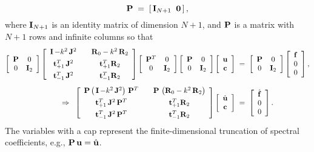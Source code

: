 \documentclass[%
secnumarabic,%
 amssymb, amsmath,%
 aps,prf,superscriptaddress,longbibliography
frontmatterverbose,
]{revtex4-2}
\begin{document}
\begin{equation}\label{eq:project}
  \mathbf{P} \;=\; \left[\,\mathbf I_{N+1}\;\; \mathbf 0 \,\right],
\end{equation}
where $\mathbf I_{N+1}$ is an identity matrix of dimension $N+1$, and $\mathbf{P}$ is a matrix with $N + 1$ rows and infinite columns so that 
\begin{align}
  \left[\begin{array}{ccc}
    \mathbf{P} & 0\\
    0 & \mathbf I_2
  \end{array}\right]\left[\begin{array}{ccc}
    \mathbf I\,\mathbf{-} k^2 \,\mathbf J^2 & & \mathbf{R}_0 - k^2\, \mathbf{R}_2\\[0.15cm]
    \mathbf{t}_{+1}^T \,\mathbf J^2 & & \mathbf{t}_{+1}^T \mathbf{R}_2\\[0.15cm]
    \mathbf{t}_{-1}^T \,\mathbf J^2 & & \mathbf{t}_{-1}^T \mathbf{R}_2
  \end{array}\right]\left[\begin{array}{ccc}
    \mathbf{P}^T & 0\\
    0 & \mathbf I_2
  \end{array}\right]\left[\begin{array}{ccc}
    \mathbf{P} & 0\\
    0 & \mathbf I_2
  \end{array}\right]\left[\begin{array}{c}
    \mathbf{u}\\
    \mathbf{c}
  \end{array}\right] \;&=\; \left[\begin{array}{ccc}
    \mathbf{P} & 0\\
    0 & \mathbf I_2
  \end{array}\right]\left[\begin{array}{c}
  \mathbf{f}\\
  0\\
  0
  \end{array}\right],\notag\\[0.15cm]
  \Rightarrow\;\; \left[\begin{array}{ccc}
    \mathbf{P} \left(\,\mathbf I\,\mathbf{-} k^2 \,\mathbf J^2\right)\,\mathbf{P}^T & & \mathbf{P}\,\left(\mathbf{R}_0 - k^2\, \mathbf{R}_2\right)\\[0.15cm]
    \mathbf{t}_{+1}^T \,\mathbf J^2\,\mathbf{P}^T & & \mathbf{t}^T_{+1} \mathbf{R}_2\\[0.15cm]
    \mathbf{t}_{-1}^T \,\mathbf J^2\,\mathbf{P}^T & & \mathbf{t}_{-1}^T \mathbf{R}_2
  \end{array}\right]\left[\begin{array}{c}
    \hat{\mathbf{u}}\\
    \mathbf{c}
  \end{array}\right] \;&=\; \left[\begin{array}{c}
  \hat{\mathbf{f}}\\
  0\\
  0
  \end{array}\right].\label{eq:rndFinal}
\end{align}
The variables with a cap represent the finite-dimensional truncation of spectral coefficients, e.g., $\mathbf{P} \,\mathbf{u} = \hat{\mathbf{u}}$.
\end{document}

